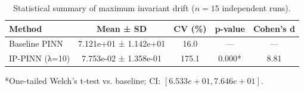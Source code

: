 
\begin{table}[h]
\centering
\caption{Statistical summary of maximum invariant drift ($n=15$ independent runs).}
\label{tab:statistical_summary}
\begin{tabular}{lcccc}
\toprule
\textbf{Method} & \textbf{Mean ± SD} & \textbf{CV (\%)} & \textbf{p-value} & \textbf{Cohen's d} \\
\midrule
Baseline PINN & 7.121e+01 ± 1.142e+01 & 16.0 & — & — \\
IP-PINN (λ=10) & 7.753e-02 ± 1.358e-01 & 175.1 & 0.000* & 8.81 \\
\bottomrule
\end{tabular}
\footnotesize{*One-tailed Welch's t-test vs. baseline; CI: $[6.533e+01, 7.646e+01]$.}
\end{table}
